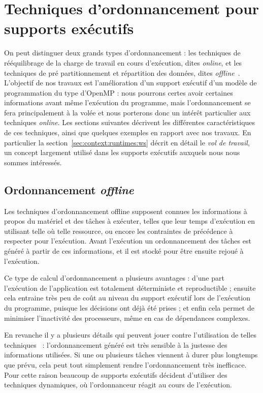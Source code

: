 \section{Techniques d'ordonnancement pour supports exécutifs}\label{sec:context:runtimes}

On peut distinguer deux grands types d'ordonnancement : les techniques de rééquilibrage de la charge de travail en cours d'exécution, dites \emph{online}, et les techniques de pré partitionnement et répartition des données, dites \emph{offline}~\cite{Karp1992}.
L'objectif de nos travaux est l'amélioration d'un support exécutif d'un modèle de programmation du type d'OpenMP : nous pourrons certes avoir certaines informations avant même l'exécution du programme, mais l'ordonnancement se fera principalement à la volée et nous porterons donc un intérêt particulier aux techniques \emph{online}.
Les sections suivantes décrivent les différentes caractéristiques de ces techniques, ainsi que quelques exemples en rapport avec nos travaux.
En particulier la section~\ref{sec:context:runtimes:ws} décrit en détail le \emph{vol de travail}, un concept largement utilisé dans les supports exécutifs auxquels nous nous sommes intéressés.

\subsection{Ordonnancement \emph{offline}}

Les techniques d'ordonnancement offline supposent connues les informations à propos du matériel et des tâches à exécuter, telles que leur temps d'exécution en utilisant telle où telle ressource, ou encore les contraintes de précédence à respecter pour l'exécution.
Avant l'exécution un ordonnancement des tâches est généré à partir de ces informations, et il est stocké pour être ensuite rejoué à l'exécution.

Ce type de calcul d'ordonnancement a plusieurs avantages : d'une part l'exécution de l'application est totalement déterministe et reproductible ; ensuite cela entraine très peu de coût au niveau du support exécutif lors de l'exécution du programme, puisque les décisions ont déjà été prises ; et enfin cela permet de minimiser l'inactivité des processeurs, même en cas de dépendances complexes.

En revanche il y a plusieurs détails qui peuvent jouer contre l'utilisation de telles techniques~\cite{Locke1992} : l'ordonnancement généré est très sensible à la justesse des informations utilisées. Si une ou plusieurs tâches viennent à durer plus longtemps que prévu, cela peut tout simplement rendre l'ordonnancement très inefficace.
Pour cette raison beaucoup de supports exécutifs décident d'utiliser des techniques dynamiques, où l'ordonnanceur réagit au cours de l'exécution.

